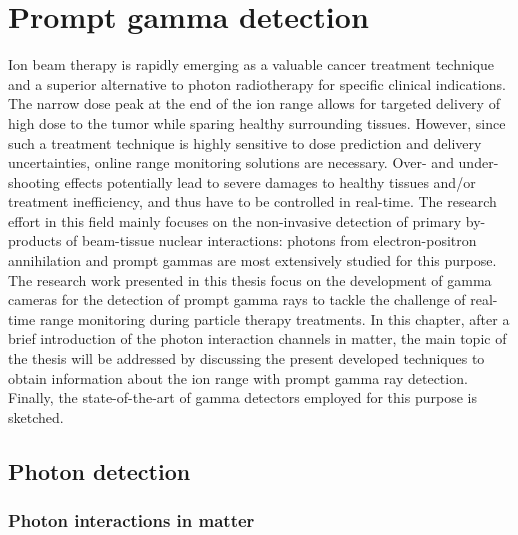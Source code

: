 \chapter{Prompt gamma detection}\label{chap::2}

\vfill

\minitoc

\newpage

\glsresetall

Ion beam therapy is rapidly emerging as a valuable cancer treatment technique and a superior alternative to photon radiotherapy for specific clinical indications. The narrow dose peak at the end of the ion range allows for targeted delivery of high dose to the tumor while sparing healthy surrounding tissues. However, since such a treatment technique is highly sensitive to dose prediction and delivery uncertainties, online range monitoring solutions are necessary. Over- and under-shooting effects potentially lead to severe damages to healthy tissues and/or treatment inefficiency, and thus have to be controlled in real-time. The research effort in this field mainly focuses on the non-invasive detection of primary by-products of beam-tissue nuclear interactions: photons from electron-positron annihilation and prompt gammas are most extensively studied for this purpose. 
The research work presented in this thesis focus on the development of gamma cameras for the detection of prompt gamma rays to tackle the challenge of real-time range monitoring during particle therapy treatments. In this chapter, after a brief introduction of the photon interaction channels in matter, the main topic of the thesis will be addressed by discussing the present developed techniques to obtain information about the ion range with prompt gamma ray detection. Finally, the state-of-the-art of gamma detectors employed for this purpose is sketched.

\section{Photon detection}


\subsection{Photon interactions in matter}


